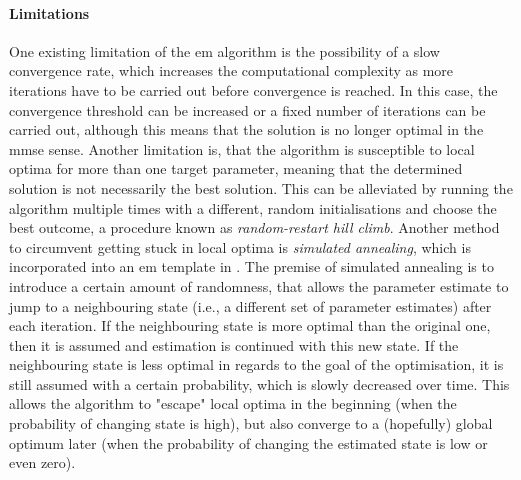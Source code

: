 \paragraph{Limitations}
One existing limitation of the \gls{em} algorithm is the possibility of a slow convergence rate, which increases the computational complexity as more iterations have to be carried out before convergence is reached. In this case, the convergence threshold can be increased or a fixed number of iterations can be carried out, although this means that the solution is no longer optimal in the \gls{mmse} sense. Another limitation is, that the algorithm is susceptible to local optima for more than one target parameter, meaning that the determined solution is not necessarily the best solution. This can be alleviated by running the algorithm multiple times with a different, random initialisations and choose the best outcome, a procedure known as \textit{random-restart hill climb}. Another method to circumvent getting stuck in local optima is \textit{simulated annealing}, which is incorporated into an \gls{em} template in \cite{Guo2007}. The premise of simulated annealing is to introduce a certain amount of randomness, that allows the parameter estimate to jump to a neighbouring state (i.e., a different set of parameter estimates) after each iteration. If the neighbouring state is more optimal than the original one, then it is assumed and estimation is continued with this new state. If the neighbouring state is less optimal in regards to the goal of the optimisation, it is still assumed with a certain probability, which is slowly decreased over time. This allows the algorithm to "escape" local optima in the beginning (when the probability of changing state is high), but also converge to a (hopefully) global optimum later (when the probability of changing the estimated state is low or even zero).




